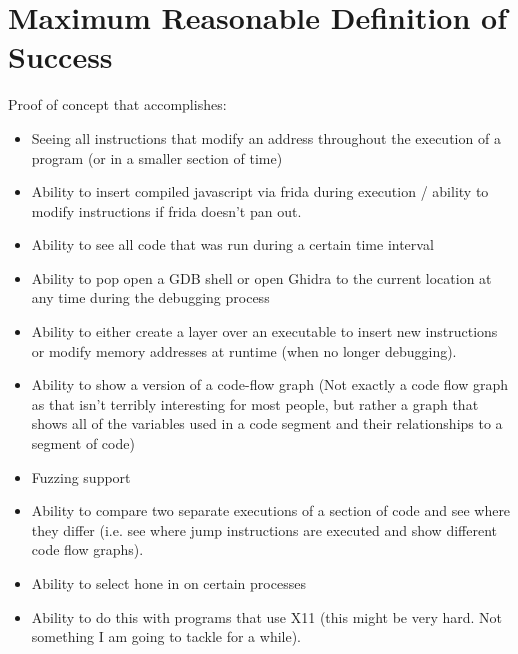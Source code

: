\section{Maximum Reasonable Definition of Success}
Proof of concept that accomplishes:
\begin{itemize}
    \item Seeing all instructions that modify an address throughout the execution of a program (or in a smaller section of time)
    \item Ability to insert compiled javascript via frida during execution / ability to modify instructions if frida doesn't pan out. 
    \item Ability to see all code that was run during a certain time interval
    \item Ability to pop open a GDB shell or open Ghidra to the current location at any time during the debugging process
    \item Ability to either create a layer over an executable to insert new instructions or modify memory addresses at runtime (when no longer debugging). 
    \item Ability to show a version of a code-flow graph (Not exactly a code flow graph as that isn't terribly interesting for most people, but rather a graph that shows all of the variables used in a code segment and their relationships to a segment of code)
    \item Fuzzing support
    \item Ability to compare two separate executions of a section of code and see where they differ (i.e. see where jump instructions are executed and show different code flow graphs). 
    \item Ability to select hone in on certain processes
    \item Ability to do this with programs that use X11 (this might be very hard. Not something I am going to tackle for a while). 
\end{itemize}

